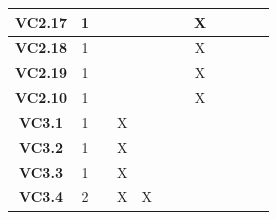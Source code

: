 \documentclass [10pt]{article}
\begin{document}
\begin{center}
\begin{tabularx} {.85\textwidth} {|c|c|c|c|c|c|c|c|c|c|c|c|}
\textbf{VC2.17}&1& & & & & & X & & & &     \\ \hline
\textbf{VC2.18}&1& & & & & & X & & & &     \\ \hline
\textbf{VC2.19}&1& & & & & & X & & & &    \\ \hline
\textbf{VC2.10}&1& & & & & & X & & & &     \\ \hline
\textbf{VC3.1}&1& &X & & & &  & & & &     \\ \hline
\textbf{VC3.2}&1& &X & & & &  & & & &     \\ \hline
\textbf{VC3.3}&1& &X & & & &  & & & &     \\ \hline
\textbf{VC3.4}&2& &X & X& & &  & & & &     \\ \hline



\end{tabularx}



\end{center}
\end{document}
